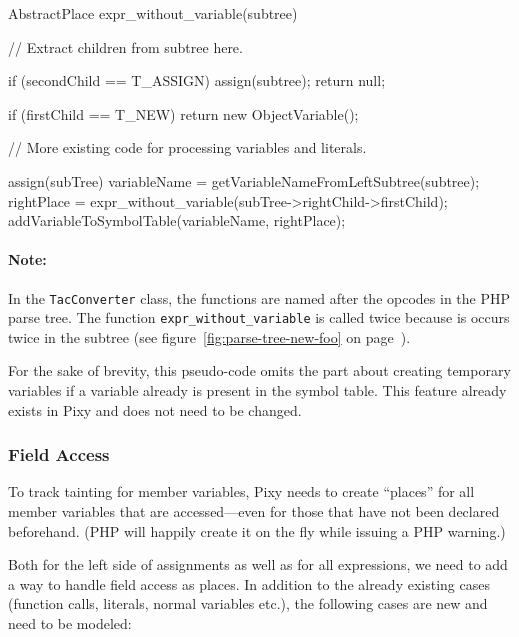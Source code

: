 \begin{textcode}
AbstractPlace expr_without_variable(subtree) {
  // Extract children from subtree here.

  if (secondChild == T_ASSIGN) {
    assign(subtree);
    return null;
  }

  if (firstChild == T_NEW) {
    return new ObjectVariable();
  }

  // More existing code for processing variables and literals.
}

assign(subTree) {
  variableName = getVariableNameFromLeftSubtree(subtree);
  rightPlace = expr_without_variable(subTree->rightChild->firstChild);
  addVariableToSymbolTable(variableName, rightPlace);
}
\end{textcode}

\paragraph{Note:} In the \texttt{TacConverter} class, the functions are named after the opcodes in the PHP parse tree. The function \texttt{expr\_without\_variable} is called twice because is occurs twice in the subtree (see figure~\ref{fig:parse-tree-new-foo} on page~\pageref{fig:parse-tree-new-foo}).

For the sake of brevity, this pseudo-code omits the part about creating temporary variables if a variable already is present in the symbol table. This feature already exists in Pixy and does not need to be changed.

\subsubsection{Field Access}

To track tainting for member variables, Pixy needs to create ``places'' for all member variables that are accessed---even for those that have not been declared beforehand. (PHP will happily create it on the fly while issuing a PHP warning.)

Both for the left side of assignments as well as for all expressions, we need to add a way to handle field access as places. In addition to the already existing cases (\eg function calls, literals, normal variables etc.), the following cases are new and need to be modeled:


